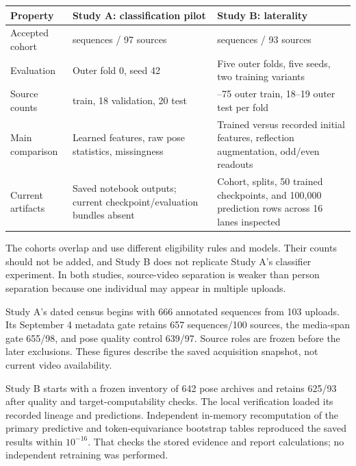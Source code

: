 \documentclass[11pt,letterpaper]{article}
\newcounter{none}
\begin{document}
{\def\LTcaptype{none} %
\begin{longtable}[]{@{}
  >{\raggedright\arraybackslash}p{}
  >{\raggedright\arraybackslash}p{}
  >{\raggedright\arraybackslash}p{}@{}}
\toprule\noalign{}
\begin{minipage}[b]{\linewidth}\raggedright
Property
\end{minipage} & \begin{minipage}[b]{\linewidth}\raggedright
Study A: classification pilot
\end{minipage} & \begin{minipage}[b]{\linewidth}\raggedright
Study B: laterality
\end{minipage} \\
\midrule\noalign{}
\endhead
\bottomrule\noalign{}
\endlastfoot
Accepted cohort & 639 sequences / 97 sources & 625 sequences / 93
sources \\
Evaluation & Outer fold 0, seed 42 & Five outer folds, five seeds, two
training variants \\
Source counts & 59 train, 18 validation, 20 test & 74--75 outer train,
18--19 outer test per fold \\
Main comparison & Learned features, raw pose statistics, missingness &
Trained versus recorded initial features, reflection augmentation,
odd/even readouts \\
Current artifacts & Saved notebook outputs; current
checkpoint/evaluation bundles absent & Cohort, splits, 50 trained
checkpoints, and 100,000 prediction rows across 16 lanes inspected \\
\end{longtable}
}

The cohorts overlap and use different eligibility rules and models.
Their counts should not be added, and Study B does not replicate Study
A's classifier experiment. In both studies, source-video separation is
weaker than person separation because one individual may appear in
multiple uploads.

Study A's dated census begins with 666 annotated sequences from 103
uploads. Its September 4 metadata gate retains 657 sequences/100
sources, the media-span gate 655/98, and pose quality control 639/97.
Source roles are frozen before the later exclusions. These figures
describe the saved acquisition snapshot, not current video availability.

Study B starts with a frozen inventory of 642 pose archives and retains
625/93 after quality and target-computability checks. The local
verification loaded its recorded lineage and predictions. Independent
in-memory recomputation of the primary predictive and token-equivariance
bootstrap tables reproduced the saved results within \(10^{-16}\). That
checks the stored evidence and report calculations; no independent
retraining was performed.
\end{document}
